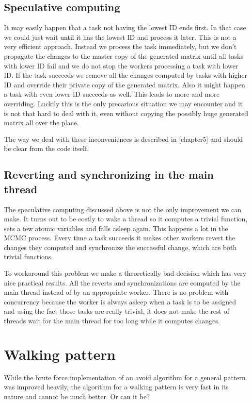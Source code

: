 \subsection{Speculative computing}
It may easily happen that a task not having the lowest ID ends first. In that case we could just wait until it has the lowest ID and process it later. This is not a very efficient approach. Instead we process the task immediately, but we don't propagate the changes to the master copy of the generated matrix until all tasks with lower ID fail and we do not stop the workers processing a task with lower ID. If the task succeeds we remove all the changes computed by tasks with higher ID and override their private copy of the generated matrix. Also it might happen a task with even lower ID succeeds as well. This leads to more and more overriding. Luckily this is the only precarious situation we may encounter and it is not that hard to deal with it, even without copying the possibly huge generated matrix all over the place.

The way we deal with these inconveniences is described in [chapter5] and should be clear from the code itself.

\subsection{Reverting and synchronizing in the main thread}
The speculative computing discussed above is not the only improvement
we can make. It turns out to be costly to wake a thread so it computes a trivial function, sets a few atomic variables and falls asleep again. This happens a lot in the MCMC process. Every time a task succeeds it makes other workers revert the changes they computed and synchronize the successful change, which are both trivial functions.

To workaround this problem we make a theoretically bad decision which has very nice practical results. All the reverts and synchronizations are computed by the main thread instead of by an appropriate worker. There is no problem with concurrency because the worker is always asleep when a task is to be assigned and using the fact those tasks are really trivial, it does not make the rest of threads wait for the main thread for too long while it computes changes.

\section{Walking pattern}
While the brute force implementation of an avoid algorithm for a general pattern was improved heavily, the algorithm for a walking pattern is very fast in its nature and cannot be much better. Or can it be?

